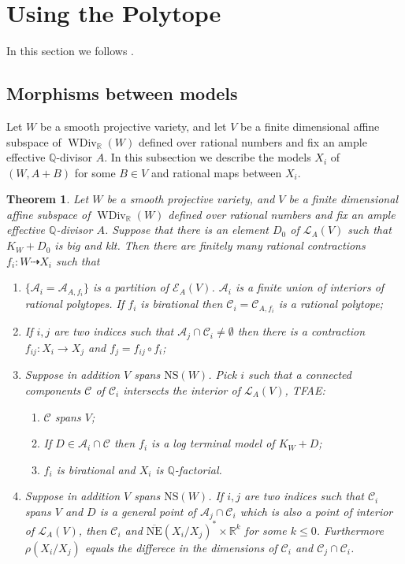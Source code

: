 \documentclass{article}
\newtheorem{thm}[defn]{Theorem}
\begin{document}
\section{Using the Polytope}
In this section we follows \cite{haconSarkisovProgram2011}.
\subsection{Morphisms between models}
  Let $W$ be a smooth projective   variety, and let $ V $ be a finite dimensional affine subspace of $ \operatorname{WDiv}_{\mathbb{R}}(W) $ defined over rational numbers and fix an ample effective $\mathbb{Q}$-divisor $A$. In this subsection we describe the models $X_{i}$ of $(W,A+B)$ for some $B \in V$ and rational maps between $X_{i}$.
\begin{thm}\label{mapbetweenAM}
  \cite[Theorem 3.3]{haconSarkisovProgram2011} Let $W$ be a smooth projective   variety, and  $ V $ be a finite dimensional affine subspace of $ \operatorname{WDiv}_{\mathbb{R}}(W) $ defined over rational numbers and fix an ample effective $\mathbb{Q}$-divisor $A$. Suppose that there is an element $D_{0}$ of $\mathcal{L}_{A}(V)$ such that $K_{W}+D_{0}$ is big and klt. Then there are finitely many rational contractions $ f_i:W\dashrightarrow X_i $ such that
  \begin{enumerate}
    \item $ \{\mathcal{A}_i=\mathcal{A}_{A,f_i}\} $ is a partition of $ \mathcal{E}_{A}(V) $. $ \mathcal{A}_i $ is a finite union of interiors of rational polytopes. If $ f_i $ is birational then $ \mathcal{C}_i=\mathcal{C}_{A,f_i} $ is a rational polytope;
    \item If $ i,j $ are two indices such that $ \mathcal{A}_j\cap \mathcal{C}_i\neq \emptyset $ then there is a contraction $ f_{ij}:X_i\to X_j $ and $ f_j=f_{ij}\circ f_i $;
    \item Suppose in addition $ V $ spans $ \mathrm{NS}(W) $. Pick $ i $ such that a connected components $ \mathcal{C} $ of $ \mathcal{C}_i $ intersects the interior of $ \mathcal{L}_A(V) $, TFAE:
    \begin{enumerate} 
      \item $ \mathcal{C} $ spans $ V $;
      \item If $ D\in \mathcal{A}_i\cap \mathcal{C} $ then $ f_i $ is a log terminal model of $ K_W+D $;
      \item $ f_i $ is birational and $ X_i $ is $ \mathbb{Q} $-factorial.
    \end{enumerate}
    \item Suppose in addition $ V $ spans $ \mathrm{NS}(W) $. If $ i,j $ are two indices such that $ \mathcal{C}_i $ spans $ V $ and $ D $ is a general point of $ \mathcal{A}_j\cap \mathcal{C}_i $ which is also a point of interior of $ \mathcal{L}_A(V) $, then $ \mathcal{C}_i $ and $ \overline{\mathrm{NE}}(X_i/X_j)^*\times \mathbb{R}^k $ for some $ k\leqslant 0 $. Furthermore $ \rho(X_i/X_j) $ equals the differece in the dimensions of $ \mathcal{C}_i $ and $ \mathcal{C}_j\cap \mathcal{C}_i $.
  \end{enumerate}
\end{thm}
\end{document}
